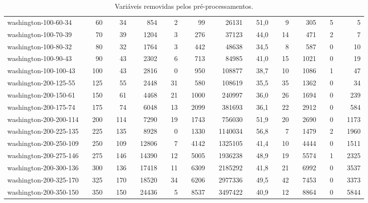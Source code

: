 \begin{table}[!ht]
{\begin{tabular}{llrlrlrlrlrlrlrlrlrlrlr}
washington-100-60-34 &  & 60 &  & 34 &  & 854 &  & 2 &  & 99 &  & 26131 &  & 51,0 &  & 9 &  & 305 &  & 5 &  & 5 \\
washington-100-70-39 &  & 70 &  & 39 &  & 1204 &  & 3 &  & 276 &  & 37123 &  & 44,0 &  & 14 &  & 471 &  & 2 &  & 7 \\
washington-100-80-32 &  & 80 &  & 32 &  & 1764 &  & 3 &  & 442 &  & 48638 &  & 34,5 &  & 8 &  & 587 &  & 0 &  & 10 \\
washington-100-90-43 &  & 90 &  & 43 &  & 2302 &  & 6 &  & 713 &  & 84985 &  & 41,0 &  & 15 &  & 1021 &  & 0 &  & 19 \\
washington-100-100-43 &  & 100 &  & 43 &  & 2816 &  & 0 &  & 950 &  & 108877 &  & 38,7 &  & 10 &  & 1086 &  & 1 &  & 47 \\ \hline
washington-200-125-55 &  & 125 &  & 55 &  & 2448 &  & 31 &  & 580 &  & 108619 &  & 35,5 &  & 35 &  & 1362 &  & 0 &  & 34 \\
washington-200-150-61 &  & 150 &  & 61 &  & 4468 &  & 21 &  & 1000 &  & 240997 &  & 36,0 &  & 26 &  & 1694 &  & 0 &  & 239 \\
washington-200-175-74 &  & 175 &  & 74 &  & 6048 &  & 13 &  & 2099 &  & 381693 &  & 36,1 &  & 22 &  & 2912 &  & 0 &  & 584 \\
washington-200-200-114 &  & 200 &  & 114 &  & 7290 &  & 19 &  & 1743 &  & 756030 &  & 51,9 &  & 20 &  & 2690 &  & 0 &  & 1173 \\
washington-200-225-135 &  & 225 &  & 135 &  & 8928 &  & 0 &  & 1330 &  & 1140034 &  & 56,8 &  & 7 &  & 1479 &  & 2 &  & 1960 \\
washington-200-250-109 &  & 250 &  & 109 &  & 12806 &  & 7 &  & 4142 &  & 1325105 &  & 41,4 &  & 10 &  & 4444 &  & 0 &  & 1511 \\
washington-200-275-146 &  & 275 &  & 146 &  & 14390 &  & 12 &  & 5005 &  & 1936238 &  & 48,9 &  & 19 &  & 5574 &  & 1 &  & 2325 \\
washington-200-300-136 &  & 300 &  & 136 &  & 17418 &  & 11 &  & 6309 &  & 2185292 &  & 41,8 &  & 21 &  & 6992 &  & 0 &  & 3537 \\
washington-200-325-170 &  & 325 &  & 170 &  & 18520 &  & 34 &  & 6206 &  & 2977336 &  & 49,5 &  & 42 &  & 7453 &  & 0 &  & 3373 \\
washington-200-350-150 &  & 350 &  & 150 &  & 24436 &  & 5 &  & 8537 &  & 3497422 &  & 40,9 &  & 12 &  & 8864 &  & 0 &  & 5844 \\ \hline
\end{tabular}%
}
\caption{Variáveis removidas pelos pré-processamentos.}
\label{tab:prep}
\end{table}

